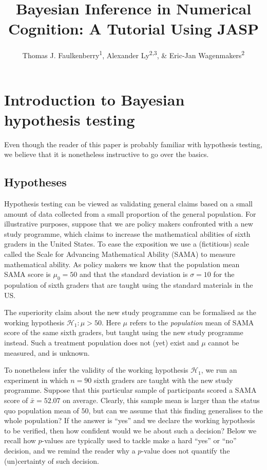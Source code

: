 \documentclass[english,,doc,floatsintext]{apa6}
\title{Bayesian Inference in Numerical Cognition: A Tutorial Using JASP}
\author{Thomas J. Faulkenberry\textsuperscript{1}, Alexander Ly\textsuperscript{2,3}, \& Eric-Jan Wagenmakers\textsuperscript{2}}
\date{}
\affiliation{
\vspace{0.5cm}
\textsuperscript{1} Tarleton State University\\\textsuperscript{2} University of Amsterdam\\\textsuperscript{3} Centrum Wiskunde \& Informatica}
\begin{document}
\maketitle

\hypertarget{introduction-to-bayesian-hypothesis-testing}{%
\section{Introduction to Bayesian hypothesis testing}\label{introduction-to-bayesian-hypothesis-testing}}

Even though the reader of this paper is probably familiar with hypothesis testing, we believe that it is nonetheless instructive to go over the basics.

\subsection{Hypotheses}

Hypothesis testing can be viewed as validating general claims based on a small amount of data collected from a small proportion of the general population. For illustrative purposes, suppose that we are policy makers confronted with a new study programme, which claims to increase the mathematical abilities of sixth graders in the United States. To ease the exposition we use a (fictitious) scale called the Scale for Advancing Mathematical Ability (SAMA) to measure mathematical ability. As policy makers we know that the population mean SAMA score is \(\mu_{0}=50\) and that the standard deviation is \(\sigma=10\) for the population of sixth graders that are taught using the standard materials in the US.

The superiority claim about the new study programme can be formalised as the working hypothesis \(\mathcal{H}_{1} : \mu > 50\). Here \(\mu\) refers to the \emph{population} mean of SAMA score of the same sixth graders, but taught using the new study programme instead. Such a treatment population does not (yet) exist and \(\mu\) cannot be measured, and is unknown.

To nonetheless infer the validity of the working hypothesis \(\mathcal{H}_{1}\), we run an experiment in which \(n=90\) sixth graders are taught with the new study programme. Suppose that this particular sample of participants scored a SAMA score of \(\bar{x} = 52.07\) on average. Clearly, this sample mean is larger than the status quo population mean of \(50\), but can we assume that this finding generalises to the whole population? If the answer is \enquote{yes} and we declare the working hypothesis to be verified, then how confident would we be about such a decision? Below we recall how \(p\)-values are typically used to tackle make a hard \enquote{yes} or \enquote{no} decision, and we remind the reader why a \(p\)-value does not quantify the (un)certainty of such decision.
\end{document}
